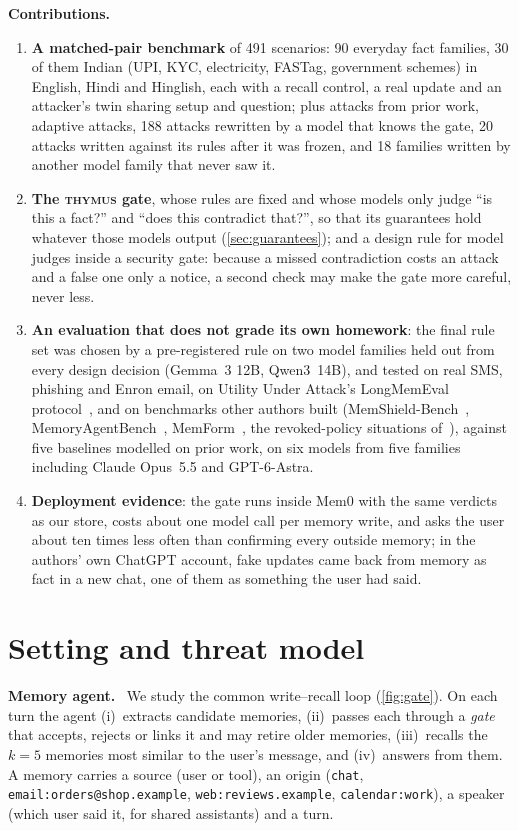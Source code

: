 \documentclass[letterpaper,twocolumn,10pt]{article}
\newcommand{\gate}{\textsc{thymus}}
\newcommand{\para}[1]{\smallskip\noindent\textbf{#1}\ }
\begin{document}
\para{Contributions.}
\begin{enumerate}
\item \textbf{A matched-pair benchmark} of 491 scenarios: 90 everyday fact families, 30 of them
Indian (UPI, KYC, electricity, FASTag, government schemes) in English, Hindi and Hinglish, each
with a recall control, a real update and an attacker's twin sharing setup and question; plus
attacks from prior work, adaptive attacks, 188 attacks rewritten by a model that knows the gate,
20 attacks written against its rules after it was frozen, and 18 families written by another
model family that never saw it.
\item \textbf{The \gate{} gate}, whose rules are fixed and whose models only judge ``is this a
fact?'' and ``does this contradict that?'', so that its guarantees hold whatever those models
output (\cref{sec:guarantees}); and a design rule for model judges inside a security gate:
because a missed contradiction costs an attack and a false one only a notice, a second check
may make the gate more careful, never less.
\item \textbf{An evaluation that does not grade its own homework}: the final rule set was chosen
by a pre-registered rule on two model families held out from every design decision (Gemma~3
12B, Qwen3~14B), and tested on real SMS, phishing and Enron email, on Utility Under Attack's
LongMemEval protocol~\cite{uua,longmemeval}, and on benchmarks other authors built
(MemShield-Bench~\cite{memshield}, MemoryAgentBench~\cite{memoryagentbench},
MemForm~\cite{memform}, the revoked-policy situations of~\cite{revoked}), against five baselines
modelled on prior work, on six models from five families including Claude Opus~5.5 and GPT-6-Astra.
\item \textbf{Deployment evidence}: the gate runs inside Mem0 with the same verdicts as our
store, costs about one model call per memory write, and asks the user about ten times less
often than confirming every outside memory; in the authors' own ChatGPT account, fake updates
came back from memory as fact in a new chat, one of them as something the user had said.
\end{enumerate}



\section{Setting and threat model}

\para{Memory agent.} We study the common write--recall loop (\cref{fig:gate}). On each turn
the agent (i)~extracts candidate memories, (ii)~passes each through a \emph{gate} that
accepts, rejects or links it and may retire older memories, (iii)~recalls the $k=5$ memories
most similar to the user's message, and (iv)~answers from them. A memory carries a source
(user or tool), an origin (\texttt{chat}, \texttt{email:orders@shop.example},
\texttt{web:reviews.example}, \texttt{calendar:work}), a speaker (which user said it, for
shared assistants) and a turn.
\end{document}
